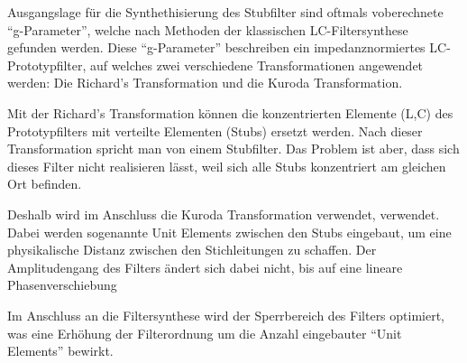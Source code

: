 Ausgangslage  für  die  Synthethisierung  des  Stubfilter  sind oftmals voberechnete
``g-Parameter'',  welche  nach  Methoden  der   klassischen  LC-Filtersynthese
gefunden  werden.  Diese  ``g-Parameter'' beschreiben  ein  impedanznormiertes
LC-Prototypfilter, auf    welches    zwei    verschiedene   Transformationen
angewendet werden: Die Richard's Transformation und die Kuroda Transformation.

Mit der Richard's Transformation können  die konzentrierten Elemente (L,C) des
Prototypfilters mit verteilte  Elementen  (Stubs)  ersetzt werden. Nach dieser
Transformation  spricht  man  von einem Stubfilter. Das Problem ist aber, dass
sich dieses Filter nicht realisieren lässt,  weil sich alle Stubs konzentriert
am gleichen Ort befinden.

Deshalb  wird  im  Anschluss  die Kuroda Transformation verwendet,  verwendet.
Dabei  werden sogenannte Unit Elements zwischen den Stubs eingebaut,  um  eine
physikalische   Distanz  zwischen  den   Stichleitungen   zu   schaffen.   Der
Amplitudengang  des  Filters ändert sich dabei nicht,  bis  auf  eine  lineare
Phasenverschiebung

Im  Anschluss  an   die  Filtersynthese  wird  der  Sperrbereich  des  Filters
optimiert,  was  eine  Erhöhung  der Filterordnung um die  Anzahl  eingebauter
``Unit  Elements'' bewirkt.

\clearpage


\clearpage

